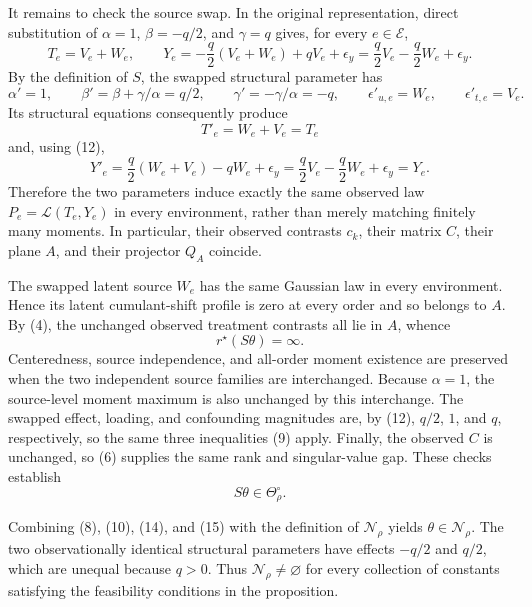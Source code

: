 It remains to check the source swap.  In the original representation, direct substitution of \(\alpha=1\), \(\beta=-q/2\), and \(\gamma=q\) gives, for every \(e\in\mathcal E\),
\[
 T_e=V_e+W_e,
 \qquad
 Y_e=-\frac q2(V_e+W_e)+qV_e+\epsilon_y
     =\frac q2V_e-\frac q2W_e+\epsilon_y.                       \tag{11}
\]
By the definition of \(S\), the swapped structural parameter has
\[
 \alpha'=1,
 \qquad
 \beta'=\beta+\gamma/\alpha=q/2,
 \qquad
 \gamma'=-\gamma/\alpha=-q,
 \qquad
 \epsilon'_{u,e}=W_e,
 \qquad
 \epsilon'_{t,e}=V_e.                                          \tag{12}
\]
Its structural equations consequently produce
\[
 T'_e=W_e+V_e=T_e
\]
and, using (12),
\[
 Y'_e=\frac q2(W_e+V_e)-qW_e+\epsilon_y
     =\frac q2V_e-\frac q2W_e+\epsilon_y
     =Y_e.                                                       \tag{13}
\]
Therefore the two parameters induce exactly the same observed law \(P_e=\mathcal L(T_e,Y_e)\) in every environment, rather than merely matching finitely many moments.  In particular, their observed contrasts \(c_k\), their matrix \(C\), their plane \(A\), and their projector \(Q_A\) coincide.

The swapped latent source \(W_e\) has the same Gaussian law in every environment.  Hence its latent cumulant-shift profile is zero at every order and so belongs to \(A\).  By (4), the unchanged observed treatment contrasts all lie in \(A\), whence
\[
 r^\star(S\theta)=\infty.                                      \tag{14}
\]
Centeredness, source independence, and all-order moment existence are preserved when the two independent source families are interchanged.  Because \(\alpha=1\), the source-level moment maximum is also unchanged by this interchange.  The swapped effect, loading, and confounding magnitudes are, by (12), \(q/2\), \(1\), and \(q\), respectively, so the same three inequalities (9) apply.  Finally, the observed \(C\) is unchanged, so (6) supplies the same rank and singular-value gap.  These checks establish
\[
 S\theta\in\Theta_\rho^\circ.                                \tag{15}
\]

Combining (8), (10), (14), and (15) with the definition of \(\mathcal N_\rho\) yields \(\theta\in\mathcal N_\rho\).  The two observationally identical structural parameters have effects \(-q/2\) and \(q/2\), which are unequal because \(q>0\).  Thus \(\mathcal N_\rho\neq\varnothing\) for every collection of constants satisfying the feasibility conditions in the proposition.
